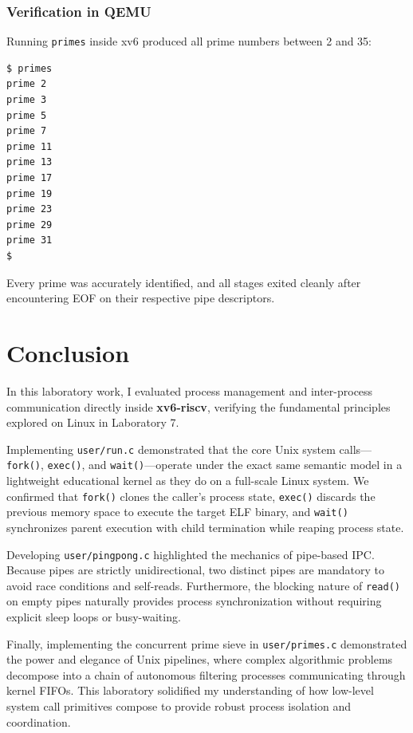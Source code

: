 \documentclass{labreport}
\begin{document}
\subsubsection{Verification in QEMU}
Running \texttt{primes} inside xv6 produced all prime numbers between 2 and 35:

\begin{lstlisting}[style=bash]
$ primes
prime 2
prime 3
prime 5
prime 7
prime 11
prime 13
prime 17
prime 19
prime 23
prime 29
prime 31
$ 
\end{lstlisting}
Every prime was accurately identified, and all stages exited cleanly after encountering EOF on their respective pipe descriptors.

\section{Conclusion}

In this laboratory work, I evaluated process management and inter-process communication directly inside \textbf{xv6-riscv}, verifying the fundamental principles explored on Linux in Laboratory 7.

Implementing \texttt{user/run.c} demonstrated that the core Unix system calls---\texttt{fork()}, \texttt{exec()}, and \texttt{wait()}---operate under the exact same semantic model in a lightweight educational kernel as they do on a full-scale Linux system. We confirmed that \texttt{fork()} clones the caller's process state, \texttt{exec()} discards the previous memory space to execute the target ELF binary, and \texttt{wait()} synchronizes parent execution with child termination while reaping process state.

Developing \texttt{user/pingpong.c} highlighted the mechanics of pipe-based IPC. Because pipes are strictly unidirectional, two distinct pipes are mandatory to avoid race conditions and self-reads. Furthermore, the blocking nature of \texttt{read()} on empty pipes naturally provides process synchronization without requiring explicit sleep loops or busy-waiting.

Finally, implementing the concurrent prime sieve in \texttt{user/primes.c} demonstrated the power and elegance of Unix pipelines, where complex algorithmic problems decompose into a chain of autonomous filtering processes communicating through kernel FIFOs. This laboratory solidified my understanding of how low-level system call primitives compose to provide robust process isolation and coordination.
\end{document}
